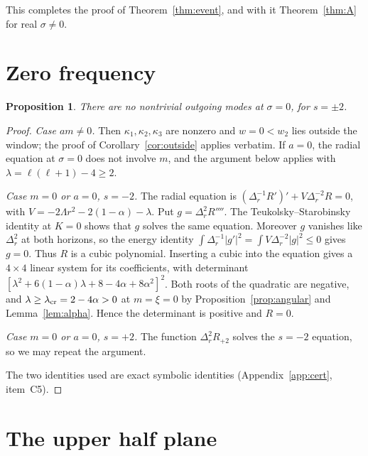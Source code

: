 \documentclass[11pt]{amsart}
\newtheorem{proposition}[theorem]{Proposition}
\theoremstyle{definition}
\theoremstyle{remark}
\numberwithin{equation}{section}
\begin{document}
This completes the proof of Theorem~\ref{thm:event}, and with it Theorem~\ref{thm:A} for real $\sigma\ne0$.

\section{Zero frequency}\label{sec:zero}
\begin{proposition}\label{prop:zero}
There are no nontrivial outgoing modes at $\sigma=0$, for $s=\pm2$.
\end{proposition}
\begin{proof}
\emph{Case $am\ne0$.} Then $\kappa_1,\kappa_2,\kappa_3$ are nonzero and $w=0<w_2$ lies outside the window; the proof of
Corollary~\ref{cor:outside} applies verbatim. If $a=0$, the radial equation at $\sigma=0$ does not involve $m$, and the
argument below applies with $\lambda=\ell(\ell+1)-4\ge2$.

\emph{Case $m=0$ or $a=0$, $s=-2$.} The radial equation is $(\Delta_r^{-1}R')'+V\Delta_r^{-2}R=0$, with
$V=-2\Lambda r^2-2(1-\alpha)-\lambda$. Put $g=\Delta_r^2R''''$. The Teukolsky--Starobinsky identity at $K=0$ shows
that $g$ solves the same equation. Moreover $g$ vanishes like $\Delta_r^2$ at both horizons, so the energy identity
$\int\Delta_r^{-1}|g'|^2=\int V\Delta_r^{-2}|g|^2\le0$ gives $g=0$. Thus $R$ is a cubic polynomial. Inserting a cubic into the equation gives a $4\times4$ linear system for its
coefficients, with determinant $[\lambda^2+6(1-\alpha)\lambda+8-4\alpha+8\alpha^2]^2$. Both roots of the quadratic
are negative, and $\lambda\ge\lambda_{\rm cr}=2-4\alpha>0$ at $m=\xi=0$ by
Proposition~\ref{prop:angular} and Lemma~\ref{lem:alpha}. Hence the determinant is positive and $R=0$.

\emph{Case $m=0$ or $a=0$, $s=+2$.} The function $\Delta_r^2R_{+2}$ solves the $s=-2$ equation, so we may repeat the argument.

The two identities used are exact symbolic identities (Appendix~\ref{app:cert}, item~C5).
\end{proof}

\section{The upper half plane}\label{sec:uhp}
\end{document}
